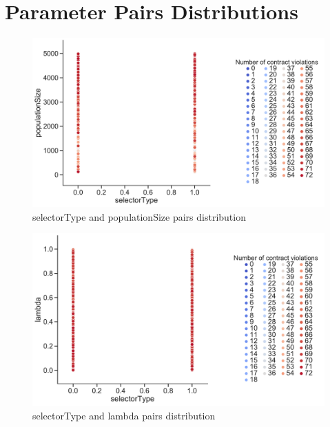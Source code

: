 \chapter{Parameter Pairs Distributions}\label{appendix:Distributions1}
\begin{figure}
	\centering
	\includegraphics[width=\textwidth]{images/PairsDistr/selectorType_populationSize.pdf}
	\caption[selectorType and populationSize pairs distribution]{selectorType and populationSize pairs distribution}
	\label{fig:selectorType_populationSize_pair}
\end{figure}
\clearpage
\begin{figure}
	\centering
	\includegraphics[width=\textwidth]{images/PairsDistr/selectorType_lambda.pdf}
	\caption[selectorType and lambda pairs distribution]{selectorType and lambda pairs distribution}
	\label{fig:selectorType_lambda_pair}
\end{figure}
\clearpage
